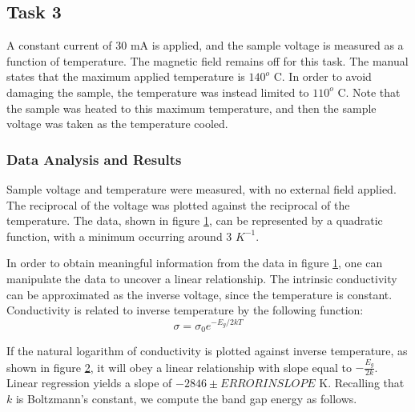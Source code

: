 \documentclass[a4paper]{article}
\begin{document}
\subsection{Task 3}

\qq A constant current of 30 mA is applied, and the sample voltage is
measured as a function of temperature. The magnetic field remains off
for this task. The manual states that the maximum applied temperature
is $140^o$ C. In order to avoid damaging the sample, the temperature
was instead limited to $110^o$ C. Note that the sample was heated to
this maximum temperature, and then the sample voltage was taken as the
temperature cooled.

\subsubsection{Data Analysis and Results}
\qq Sample voltage and temperature were measured, with no external
field applied. The reciprocal of the voltage was plotted against the
reciprocal of the temperature. The data, shown in figure
\ref{task23plot}, can be represented by a quadratic function, with a
minimum occurring around 3 $K^{-1}$.

\begin{figure}[H]
\centering
\label{task23plot}
\end{figure}

\qq In order to obtain meaningful information from the data in figure
\ref{task23plot}, one can manipulate the data to uncover a linear
relationship. The intrinsic conductivity can be approximated as the
inverse voltage, since the temperature is constant. Conductivity is
related to inverse temperature by the following function:
$$\sigma = \sigma_0 e^{-E_g/2kT}$$

\begin{figure}[H]
\centering
\label{task23plotLINEAR}
\end{figure}

\qq If the natural logarithm of conductivity is plotted against
inverse temperature, as shown in figure \ref{task23plotLINEAR}, it
will obey a linear relationship with slope equal to $-
\frac{E_g}{2k}$. Linear regression yields a slope of $-2846 \pm
ERRORINSLOPE$ K. Recalling that $k$ is Boltzmann's constant, we
compute the band gap energy as follows.
\end{document}
